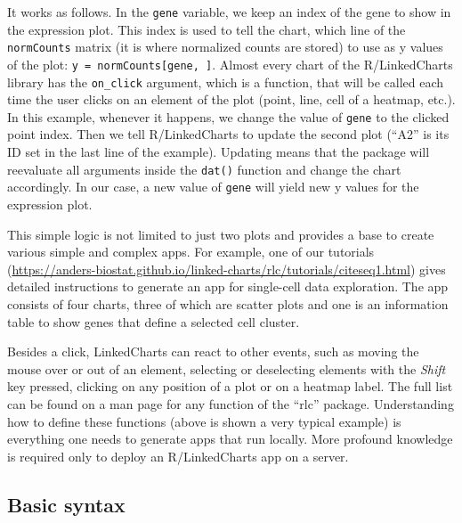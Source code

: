 \documentclass[twocolumn,10pt]{article}
\begin{document}
It works as follows. In the \texttt{gene} variable, we keep an index of the gene to show in the expression plot. This index is used to tell the chart, which line of the \texttt{normCounts} matrix (it is where normalized counts are stored) to use as y values of the plot: \texttt{y = normCounts[gene, ]}. Almost every chart of the R/LinkedCharts library has the \texttt{on_click} argument, which is a function, that will be called each time the user clicks on an element of the plot (point, line, cell of a heatmap, etc.). In this example, whenever it happens, we change the value of \texttt{gene} to the clicked point index. Then we tell R/LinkedCharts to update the second plot (``A2'' is its ID set in the last line of the example). Updating means that the package will reevaluate all arguments inside the \texttt{dat()} function and change the chart accordingly. In our case, a new value of \texttt{gene} will yield new y values for the expression plot.

This simple logic is not limited to just two plots and provides a base to create various simple and complex apps. For example, one of our tutorials (\url{https://anders-biostat.github.io/linked-charts/rlc/tutorials/citeseq1.html}) gives detailed instructions to generate an app for single-cell data exploration. The app consists of four charts, three of which are scatter plots and one is an information table to show genes that define a selected cell cluster.

Besides a click, LinkedCharts can react to other events, such as moving the mouse over or out of an element, selecting or deselecting elements with the \emph{Shift} key pressed, clicking on any position of a plot or on a heatmap label. The full list can be found on a man page for any function of the ``rlc'' package. Understanding how to define these functions (above is shown a very typical example) is everything one needs to generate apps that run locally. More profound knowledge is required only to deploy an R/LinkedCharts app on a server. 

\subsection{Basic syntax}
\end{document}
